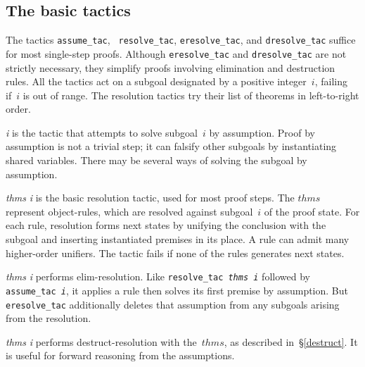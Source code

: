 \subsection{The basic tactics}
The tactics \texttt{assume_tac}, {\tt
resolve_tac}, \texttt{eresolve_tac}, and \texttt{dresolve_tac} suffice for most
single-step proofs.  Although \texttt{eresolve_tac} and \texttt{dresolve_tac} are
not strictly necessary, they simplify proofs involving elimination and
destruction rules.  All the tactics act on a subgoal designated by a
positive integer~$i$, failing if~$i$ is out of range.  The resolution
tactics try their list of theorems in left-to-right order.

\begin{ttdescription}
\item[\ttindex{assume_tac} {\it i}] 
  is the tactic that attempts to solve subgoal~$i$ by assumption.  Proof by
  assumption is not a trivial step; it can falsify other subgoals by
  instantiating shared variables.  There may be several ways of solving the
  subgoal by assumption.

\item[\ttindex{resolve_tac} {\it thms} {\it i}]
  is the basic resolution tactic, used for most proof steps.  The $thms$
  represent object-rules, which are resolved against subgoal~$i$ of the
  proof state.  For each rule, resolution forms next states by unifying the
  conclusion with the subgoal and inserting instantiated premises in its
  place.  A rule can admit many higher-order unifiers.  The tactic fails if
  none of the rules generates next states.

\item[\ttindex{eresolve_tac} {\it thms} {\it i}] 
  performs elim-resolution.  Like \texttt{resolve_tac~{\it thms}~{\it i\/}}
  followed by \texttt{assume_tac~{\it i}}, it applies a rule then solves its
  first premise by assumption.  But \texttt{eresolve_tac} additionally deletes
  that assumption from any subgoals arising from the resolution.

\item[\ttindex{dresolve_tac} {\it thms} {\it i}]
  performs destruct-resolution with the~$thms$, as described
  in~\S\ref{destruct}.  It is useful for forward reasoning from the
  assumptions.
\end{ttdescription}

